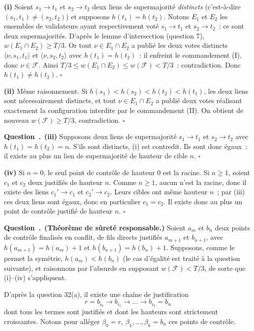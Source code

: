 \documentclass[11pt,a4paper]{article}
\renewcommand{\Q}{\medskip\par\stepcounter{qcnt}\noindent\textbf{\color{cnc}Question~\theqcnt.}~}
\begin{document}
\textbf{(i)} Soient $s_1\to t_1$ et $s_2\to t_2$ deux liens de supermajorité \emph{distincts}
(c'est-à-dire $(s_1,t_1)\ne(s_2,t_2)$) et supposons $h(t_1)=h(t_2)$. Notons $E_1$ et $E_2$
les ensembles de validateurs ayant respectivement voté $s_1\to t_1$ et $s_2\to t_2$~: ce sont
deux supermajorités. D'après le lemme d'intersection (question 7),
$w(E_1\cap E_2)\ge T/3$. Or tout $\nu\in E_1\cap E_2$ a publié les deux votes distincts
$\langle\nu,s_1,t_1\rangle$ et $\langle\nu,s_2,t_2\rangle$ avec $h(t_1)=h(t_2)$~: il enfreint
le commandement (I), donc $\nu\in\mathcal{F}$. Ainsi
$T/3\le w(E_1\cap E_2)\le w(\mathcal{F})<T/3$~: contradiction. Donc $h(t_1)\ne h(t_2)$.
\hfill$\square$

\textbf{(ii)} Même raisonnement. Si $h(s_1)<h(s_2)<h(t_2)<h(t_1)$, les deux liens sont
nécessairement distincts, et tout $\nu\in E_1\cap E_2$ a publié deux votes réalisant
exactement la configuration interdite par le commandement (II). On obtient de nouveau
$w(\mathcal{F})\ge T/3$, contradiction. \hfill$\square$

\Q \textbf{(iii)} Supposons deux liens de supermajorité $s_1\to t_1$ et $s_2\to t_2$ avec
$h(t_1)=h(t_2)=n$. S'ils sont distincts, (i) est contredit. Ils sont donc égaux~: il existe
au plus un lien de supermajorité de hauteur de cible $n$. \hfill$\square$

\textbf{(iv)} Si $n=0$, le seul point de contrôle de hauteur $0$ est la racine. Si $n\ge 1$,
soient $c_1$ et $c_2$ deux justifiés de hauteur $n$. Comme $n\ge 1$, aucun n'est la racine,
donc il existe des liens $c_1'\to c_1$ et $c_2'\to c_2$. Leurs cibles ont même hauteur $n$~;
par (iii) ces deux liens sont égaux, donc en particulier $c_1=c_2$. Il existe donc au plus un
point de contrôle justifié de hauteur $n$. \hfill$\square$

\Q \textbf{(Théorème de sûreté responsable.)} Soient $a_m$ et $b_n$ deux points de contrôle
finalisés en conflit, de fils directs justifiés $a_{m+1}$ et $b_{n+1}$, avec
$h(a_{m+1})=h(a_m)+1$ et $h(b_{n+1})=h(b_n)+1$. Supposons, comme le permet la symétrie,
$h(a_m)<h(b_n)$ (le cas d'égalité est traité à la question suivante), et raisonnons par
l'absurde en supposant $w(\mathcal{F})<T/3$, de sorte que (i)--(iv) s'appliquent.

D'après la question 32(a), il existe une chaîne de justification
\[ r = b_{i_0}\to b_{i_1}\to\dots\to b_{i_k}=b_n \]
dont tous les termes sont justifiés et dont les hauteurs sont strictement croissantes.
Notons pour alléger $\beta_0=r,\ \beta_1,\dots,\beta_k=b_n$ ces points de contrôle.
\end{document}
